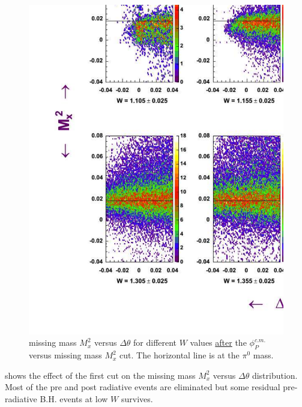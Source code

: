 \begin{figure}[h]
 \begin{center}
 \includegraphics[width = 15.2cm, bb=40 40 1220 1000]{data_reduction/img/bh_mm_dth_after} 
  \caption[missing mass $M_x^2$ versus $\Delta\theta$ for different $W$ values after the $\phi_P^{c.m.}$ versus missing mass $M_x^2$ cut]
          { missing mass $M_x^2$ versus $\Delta\theta$ for different $W$ values \underline{after} the
                     $\phi_P^{c.m.}$ versus missing mass $M_x^2$ cut. 
	             The horizontal line is at the $\pi^0$ mass.}
 \label{fig:bh_mm_dth_after}
 \end{center}
\end{figure}

 shows the effect of the first cut on the 
missing mass $M_x^2$ versus $\Delta\theta$ distribution. Most of the pre and post radiative events
are eliminated but some residual pre-radiative  B.H. events at low $W$ survives.

